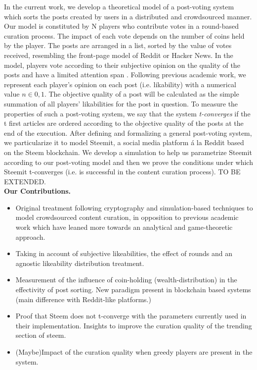   
 In the current work, we develop a theoretical model of a post-voting system which sorts the posts created by users in a distributed and crowdsourced manner. 
  Our model is constituted by N players who contribute votes in a round-based curation process. The impact of each vote depends on the number of coins held by the player.
   The posts are arranged in a list, sorted by the value of votes received, resembling the front-page model of Reddit or Hacker News. In the model, players vote according to their subjective opinion on the quality of the posts and have a limited attention span \attspan.  
   Following previous academic work, we represent each player's opinion on each post (i.e. likability) with a numerical value $n \in { 0,1 }$.  
   The objective quality of a post will be calculated as the simple summation of all players' likabilities for the post in question. To measure the properties of such a post-voting system, we say that the system \textit{t-converges} if the t first articles are ordered according to the objective quality of the posts at the end of the execution.
  After defining and formalizing a general post-voting system, we particularize it to model Steemit, a social media platform á la Reddit based on the Steem blockchain.
   We develop a simulation to help us parametrize Steemit according to our post-voting model and then we prove the conditions under which Steemit t-converges (i.e. is successful in the content curation process). TO BE EXTENDED.\\
  
  \textbf{Our Contributions.}  
  
  \begin{itemize}
  
  \item Original treatment following cryptography and simulation-based techniques to model crowdsourced content curation, in opposition to previous academic work which have leaned more towards an analytical and game-theoretic approach.
  
  \item Taking in account of subjective likeabilities, the effect of rounds and an agnostic likeability distribution treatment.
  
  \item Measurement of the influence of coin-holding (wealth-distribution) in the effectivity of post sorting. New paradigm present in blockchain based systems (main difference with Reddit-like platforms.)
   
  \item Proof that Steem does not t-converge with the parameters currently used in their implementation. Insights to improve the curation quality of the trending section of steem.
   
  \item (Maybe)Impact of the curation quality when greedy players are present in the system.
   
  \end{itemize}
    

  
  
  